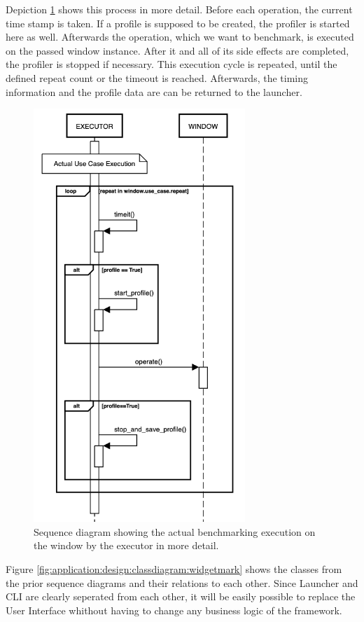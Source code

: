 Depiction \ref{fig:application:design:executor} shows this process in more
detail. Before each operation, the current time stamp is taken. If a profile is
supposed to be created, the profiler is started here as well. Afterwards the
operation, which we want to benchmark, is executed on the passed window
instance.  After it and all of its side effects are completed, the profiler is
stopped if necessary. This execution cycle is repeated, until the defined repeat
count or the timeout is reached. Afterwards, the timing information and the
profile data are can be returned to the launcher.

\begin{figure}[h]
    \centering
    \includegraphics[width=8cm]{resources/img/sequence/executor}
    \caption{
        Sequence diagram showing the actual benchmarking execution on the window
        by the executor in more detail.
    }
    \label{fig:application:design:executor}
\end{figure}

Figure \ref{fig:application:design:classdiagram:widgetmark} shows the classes
from the prior sequence diagrams and their relations to each other. Since
Launcher and CLI are clearly seperated from each other, it will be easily
possible to replace the User Interface whithout having to change any business
logic of the framework. 

